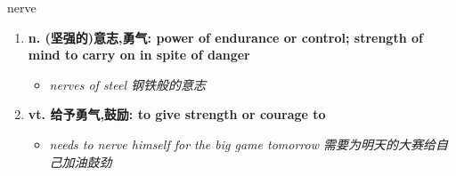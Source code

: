 
\begin{frame}
{\huge nerve}
\begin{center}
\begin{enumerate}\Large
  \item \textbf{n. (坚强的)意志,勇气: power of endurance or control; strength of mind to carry on in spite of danger}
  \begin{itemize}
    \item \em{\Large{nerves of steel 钢铁般的意志}}
  \end{itemize}
  \item \textbf{vt. 给予勇气,鼓励: to give strength or courage to}
  \begin{itemize}
    \item \em{\Large{needs to nerve himself for the big game tomorrow 需要为明天的大赛给自己加油鼓劲}}
  \end{itemize}
\end{enumerate}
\end{center}
\end{frame}
